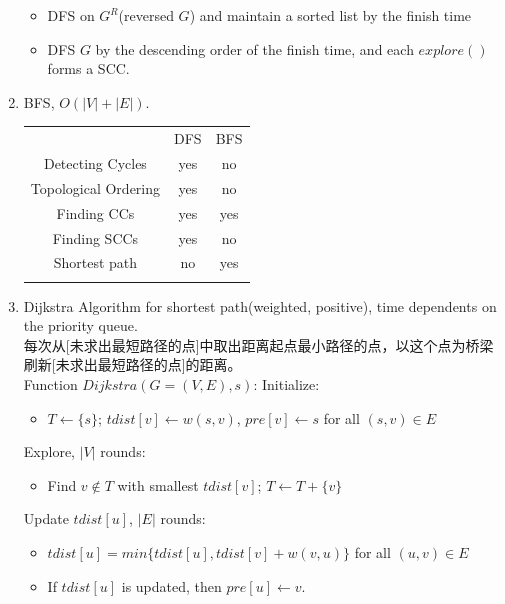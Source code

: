 \documentclass[10pt, a4paper, twocolumn]{article}
\begin{document}
\begin{enumerate}[leftmargin = 12pt, topsep = 0pt, itemsep=0pt, partopsep = 0pt]
\begin{itemize}[leftmargin = 12pt, topsep = 0pt, itemsep=0pt, partopsep = 0pt]
        \item DFS on $G^R$(reversed $G$) and maintain a sorted list by the finish time
        \item DFS $G$ by the descending order of the finish time, and each $explore()$ forms a SCC.
        \end{itemize}
    \item BFS, $O(|V|+|E|)$.
        \begin{table}[htbp]
    	\centering
    	\begin{tabular}{ccc}
    		\hline\hline\noalign{\smallskip}	
    		 & DFS & BFS  \\
    		\noalign{\smallskip}\hline\noalign{\smallskip}
    		Detecting Cycles & yes & no \\
    		Topological Ordering & yes & no \\
    		Finding CCs & yes & yes \\
    		Finding SCCs & yes & no \\
    		Shortest path & no & yes \\
    		\noalign{\smallskip}\hline
    	\end{tabular}
        \end{table}
    \item Dijkstra Algorithm for shortest path(weighted, positive), time dependents on the priority queue.\\
        每次从[未求出最短路径的点]中取出距离起点最小路径的点，以这个点为桥梁刷新[未求出最短路径的点]的距离。\\
        Function $Dijkstra(G=(V,E),s)$: Initialize:
        \begin{itemize}[leftmargin = 12pt, topsep = 0pt, itemsep=0pt, partopsep = 0pt]
        \item $T\leftarrow \{s\}$; $tdist[v]\leftarrow w(s,v)$, $pre[v]\leftarrow s$ for all $(s,v)\in E$
        \end{itemize}
        Explore, $|V|$ rounds:
        \begin{itemize}[leftmargin = 12pt, topsep = 0pt, itemsep=0pt, partopsep = 0pt]
        \item Find $v\notin T$ with smallest $tdist[v]$; $T\leftarrow T+\{v\}$
        \end{itemize}
        Update $tdist[u]$, $|E|$ rounds:
        \begin{itemize}[leftmargin = 12pt, topsep = 0pt, itemsep=0pt, partopsep = 0pt]
        \item $tdist[u]=min\{tdist[u], tdist[v]+w(v,u)\}$ for all $(u,v)\in E$
        \item If $tdist[u]$ is updated, then $pre[u]\leftarrow v$.

\end{itemize}
\end{enumerate}
\end{document}
